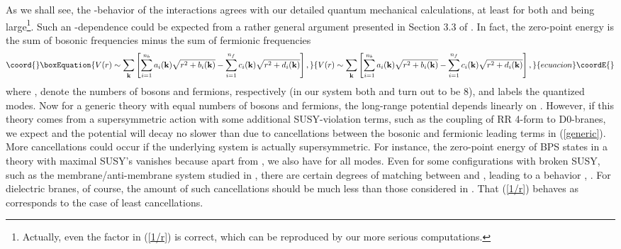 \documentclass[a4paper,12pt]{article}
\begin{document}
As we shall see, the \coordHE{}-behavior of the interactions agrees with our detailed quantum mechanical calculations, at least for both \coordHE{} and \coordHE{} being large\footnote{Actually, even the factor \coordHE{} in (\ref{1/r}) is correct, which can be reproduced by our more serious computations.}. Such an \coordHE{}-dependence could be expected from a rather general argument presented in Section 3.3 of \cite{AB}. In fact, the zero-point energy is the sum of bosonic frequencies minus the sum of fermionic frequencies
\begin{equation}\coord{}\boxEquation{
V(r)\sim\sum_{\bf k}\left[\sum_{i=1}^{n_{b}}a_{i}({\bf k})\sqrt{r^{2}+b_{i}({\bf k})}-\sum_{i=1}^{n_{f}}c_{i}({\bf k})\sqrt{r^{2}+d_{i}({\bf k})}\right],
\label{generic}
}{
V(r)\sim\sum_{\bf k}\left[\sum_{i=1}^{n_{b}}a_{i}({\bf k})\sqrt{r^{2}+b_{i}({\bf k})}-\sum_{i=1}^{n_{f}}c_{i}({\bf k})\sqrt{r^{2}+d_{i}({\bf k})}\right],
}{ecuacion}\coordE{}\end{equation}
where \coordHE{}, \coordHE{} denote the numbers of bosons and fermions, respectively (in our system both \coordHE{} and \coordHE{} turn out to be 8), and \coordHE{} labels the quantized modes. Now for a generic theory with equal numbers of bosons and fermions, the long-range potential depends linearly on \coordHE{}. However, if this theory comes from a supersymmetric action with some additional SUSY-violation terms, such as the coupling of RR 4-form \coordHE{} to D0-branes, we expect \coordHE{} and the potential will decay no slower than \coordHE{} due to cancellations between the bosonic and fermionic leading terms in (\ref{generic}). More cancellations could occur if the underlying system is actually supersymmetric. For instance, the zero-point energy of BPS states in a theory with maximal SUSY's vanishes because apart from \coordHE{}, we also have \coordHE{} for all modes. Even for some configurations with broken SUSY, such as the membrane/anti-membrane system studied in \cite{AB}, there are certain degrees of matching between \coordHE{} and \coordHE{}, leading to a behavior \coordHE{}, \coordHE{}. For dielectric branes, of course, the amount of such cancellations should be much less than those considered in \cite{AB}. That (\ref{1/r}) behaves as \coordHE{} corresponds to the case of least cancellations.
\end{document}
